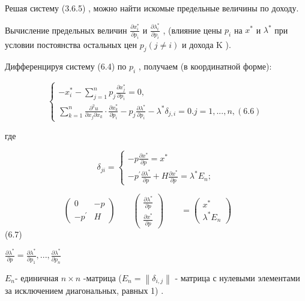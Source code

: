 \documentclass[12pt, 4paper]{book}
\begin{document}
{Решая систему (3.6.5) , можно найти искомые предельные величины по доходу.
\par

Вычисление предельных величин $\frac{\partial x_{i}^{*}}{\partial p_i}$ и $\frac{\partial \lambda_{i}^{*}}{\partial p_i}$ ,  (влияние цены $p_i$ на $x^{*}$ и $\lambda^{*}$ при условии постоянства остальных цен $p_j(j \neq i)$ и дохода K ).
\par

Дифференцируя систему (6.4) по $p_i$ , получаем (в координатной форме): 
\begin{center}
$$\left\{
\begin{aligned}
-x_{i}^{*}-\sum\limits_{j=1}^{n}{p_j}\frac{\partial x_{j}^{*}}{\partial p_i} = 0,\\
\sum\limits_{k=1}^{n} \frac{\partial^2 u}{\partial x_j \partial x_k} \cdot \frac{\partial x_{k}^{*}}{\partial p_i} - p_j \frac{\partial \lambda^{*}}{\partial p_i} - \lambda^{*} \delta_{j,i} = 0. j=1,...,n,  (6.6)
\end{aligned}
\right.$$
\end{center}
где
\begin{center}
$$\delta_{ji}= \left\{ 
\begin{aligned}
-p \frac{\partial x^{*}}{\partial p}= x^{*}\\
-p^{'}\frac{\partial \lambda^{*}}{\partial p} + H \frac{\partial x^{*}}{\partial p} = \lambda^{*}E_n;
\end{aligned}
\right.$$
\end{center}

\[ \begin{pmatrix} 0 & -p \\ -p^{'} & H \end{pmatrix} \qquad
	 \begin{pmatrix} \frac{\partial \lambda^{*}}{\partial p}\\ 
\frac{\partial x^{*}}{\partial p} \end{pmatrix} \qquad =
	 \begin{pmatrix} x^{*} \\ \lambda^{*}E_n \end{pmatrix} \qquad \] (6.7)

\begin{center}
$\frac{\partial \lambda^{*}}{\partial p} = \frac{\partial \lambda^{*}}{\partial p_1},...,\frac{\partial \lambda^{*}}{\partial p_n}$
\end{center}
$E_{n}$- единичная $n \times n$ -матрица ($E_n = \left\|\delta_{i,j} \right\|$  - матрица с нулевыми элементами за исключением диагональных, равных 1) . 
\par

}
\end{document}
